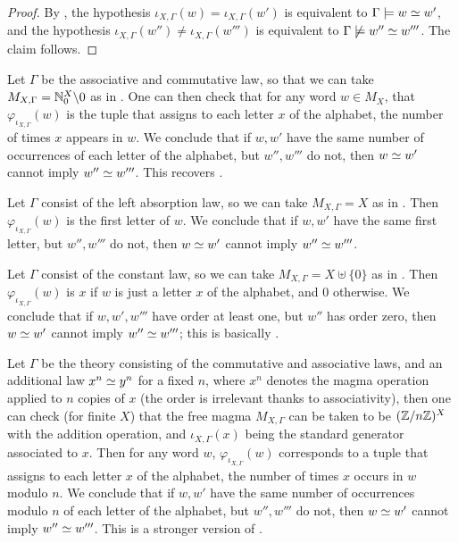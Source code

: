 \begin{proof}
  By , the hypothesis $\iota_{X,\Gamma}(w) = \iota_{X,\Gamma}(w')$ is equivalent to $\Gamma \models w \simeq w'$, and the hypothesis $\iota_{X,\Gamma}(w'') \neq \iota_{X,\Gamma}(w''')$ is equivalent to $\Gamma \not\models w'' \simeq w'''$. The claim follows.
\end{proof}

\begin{example}
  Let $\Gamma$ be the associative and commutative law, so that we can take $M_{X,\Gamma} = \mathbb{N}_0^X \backslash 0$ as in . One can then check that for any word $w \in M_X$, that $\varphi_{\iota_{X,\Gamma}}(w)$ is the tuple that assigns to each letter $x$ of the alphabet, the number of times $x$ appears in $w$. We conclude that if $w,w'$ have the same number of occurrences of each letter of the alphabet, but $w'', w'''$ do not, then $w \simeq w'$ cannot imply $w'' \simeq w'''$. This recovers .
\end{example}

\begin{example}
  Let $\Gamma$ consist of the left absorption law, so we can take $M_{X,\Gamma} = X$ as in . Then $\varphi_{\iota_{X,\Gamma}}(w)$ is the first letter of $w$. We conclude that if $w,w'$ have the same first letter, but $w'', w'''$ do not, then $w \simeq w'$ cannot imply $w'' \simeq w'''$.
\end{example}

\begin{example}
  Let $\Gamma$ consist of the constant law, so we can take $M_{X,\Gamma} = X \uplus \{0\}$ as in . Then $\varphi_{\iota_{X,\Gamma}}(w)$ is $x$ if $w$ is just a letter $x$ of the alphabet, and $0$ otherwise. We conclude that if $w,w', w'''$ have order at least one, but $w''$ has order zero, then $w \simeq w'$ cannot imply $w'' \simeq w'''$; this is basically .
\end{example}

\begin{example}
  Let $\Gamma$ be the theory consisting of the commutative and associative laws, and an additional law $x^n \simeq y^n$ for a fixed $n$, where $x^n$ denotes the magma operation applied to $n$ copies of $x$ (the order is irrelevant thanks to associativity), then one can check (for finite $X$) that the free magma $M_{X,\Gamma}$ can be taken to be $(\mathbb{Z}/n\mathbb{Z})^X$ with the addition operation, and $\iota_{X,\Gamma}(x)$ being the standard generator associated to $x$. Then for any word $w$, $\varphi_{\iota_{X,\Gamma}}(w)$ corresponds to a tuple that assigns to each letter $x$ of the alphabet, the number of times $x$ occurs in $w$ modulo $n$. We conclude that if $w,w'$ have the same number of occurrences modulo $n$ of each letter of the alphabet, but $w'', w'''$ do not, then $w \simeq w'$ cannot imply $w'' \simeq w'''$. This is a stronger version of .
\end{example}

